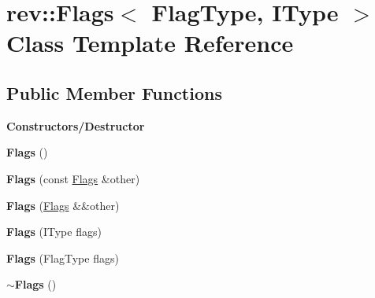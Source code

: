 \hypertarget{classrev_1_1_flags}{}\section{rev\+::Flags$<$ Flag\+Type, I\+Type $>$ Class Template Reference}
\label{classrev_1_1_flags}
\subsection*{Public Member Functions}
\begin{Indent}\textbf{ Constructors/\+Destructor}\par
\begin{DoxyCompactItemize}
\item 
\mbox{\label{classrev_1_1_flags_a66f6fafe3ec97ba8aaadc249e23bb8f6}} 
{\bfseries Flags} ()
\item 
\mbox{\label{classrev_1_1_flags_ac53afc53b5fb3fc3ee9756d092d6fca8}} 
{\bfseries Flags} (const \mbox{\hyperlink{classrev_1_1_flags}{Flags}} \&other)
\item 
\mbox{\label{classrev_1_1_flags_ab40cc4d8d7f0370ab5432d7de6e9b851}} 
{\bfseries Flags} (\mbox{\hyperlink{classrev_1_1_flags}{Flags}} \&\&other)
\item 
\mbox{\label{classrev_1_1_flags_a02a60610a853a8fb83e34998794b5d77}} 
{\bfseries Flags} (I\+Type flags)
\item 
\mbox{\label{classrev_1_1_flags_a98f45a7e21cbae2790a21a99fb7cafcc}} 
{\bfseries Flags} (Flag\+Type flags)
\item 
\mbox{\label{classrev_1_1_flags_a427acfa0f7767e5aa8acc1a8a1fd56e2}} 
{\bfseries $\sim$\+Flags} ()
\end{DoxyCompactItemize}
\end{Indent}
